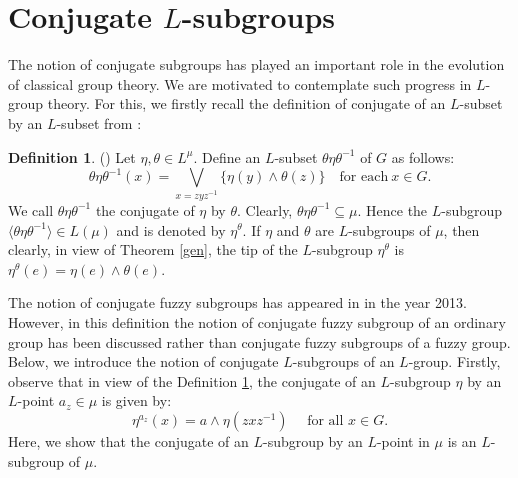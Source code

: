 \documentclass[10pt]{article}
\theoremstyle{plain}
\theoremstyle{definition}
\newtheorem{definition}[theorem]{Definition}
\theoremstyle{remark}
\theoremstyle{case}
\begin{document}
	
\section{Conjugate $L$-subgroups}
	The notion of conjugate subgroups has played an important role in the evolution of classical group theory. We are motivated to contemplate such progress in $L$-group theory. For this, we firstly recall the definition of conjugate   of an $L$-subset by an $L$-subset from \cite{jahan_nil}:

\begin{definition}\label{dfncon}(\cite{jahan_nil})
	Let $\eta, \theta \in L^{\mu}$. Define an $L$-subset $\theta\eta\theta^{{-1} } $ of $G$ as follows:
	\[
	\theta\eta\theta^{{-1} } ( x ) = \bigvee\limits _{x = z y z^{-1} } \{ \eta ( y ) \wedge \theta ( z ) \}\quad\text{for each} \ x \in G.
	\]
	We call $\theta\eta\theta^{{-1} }$ the conjugate of $\eta$ by $\theta$. Clearly, $\theta\eta\theta^{{-1} } \subseteq \mu.$ Hence the $L$-subgroup $\langle\theta\eta\theta^{{-1} }\rangle \in L(\mu) $ and is denoted by $\eta ^ \theta.$ If $\eta$ and $\theta $ are $L$-subgroups of $\mu$, then clearly, in view of Theorem \ref{gen}, the tip of the $L$-subgroup $\eta^\theta$  is  $\eta^{\theta}(e)=\eta (e)\wedge \theta(e)$.
\end{definition}

\noindent The notion of conjugate fuzzy subgroups has appeared in \cite{shukla_con} in the year 2013. However, in this definition the notion of conjugate fuzzy subgroup of an ordinary group has been discussed rather than conjugate fuzzy subgroups of a fuzzy group. Below, we introduce the notion of conjugate  $L$-subgroups of an $L$-group. Firstly, observe that in view of the Definition \ref{dfncon}, the conjugate of an $L$-subgroup $\eta$ by an $L$-point $a_z \in \mu$ is  given by:
 \[ \eta^{a_z}(x) = a \wedge \eta(zxz^{-1}) \quad \text{ for all } x \in G. \]	
\noindent Here, we show that the conjugate of an $L$-subgroup by an $L$-point in $\mu$ is an $L$-subgroup of $\mu$. 
\end{document}
